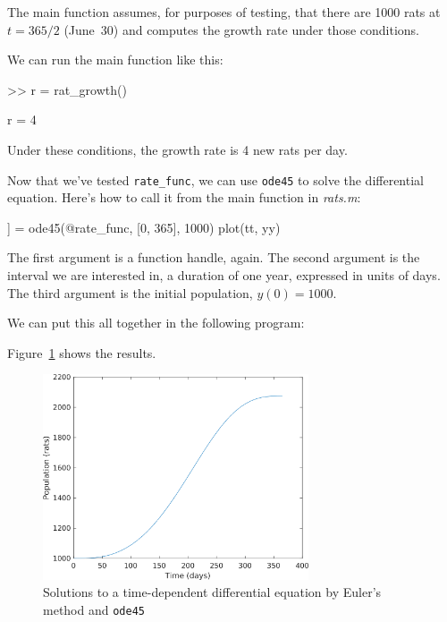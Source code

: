 The main function assumes, for purposes of testing, that
there are 1000 rats at $t=365/2$ (June~30) and computes the growth rate under those conditions.

We can run the main function like this:

\begin{code}
>> r = rat_growth()

r = 4
\end{code}

Under these conditions, the growth rate is 4 new rats per day.

Now that we've tested \lstinline{rate_func}, we can use \lstinline{ode45} to solve the differential equation.
Here's how to call it from the main function in \emph{rats.m}:

\begin{code}
[tt, yy]] = ode45(@rate_func, [0, 365], 1000)
plot(tt, yy)
\end{code}

The first argument is a function handle, again.  The second argument is the interval we are interested in, a duration of one year, expressed in units of days.
The third argument is the initial population, $y(0) = 1000$.


We can put this all together in the following program:


Figure~\ref{fig:rats} shows the results.

\begin{figure}[ht]
\centerline{\includegraphics[width=0.7\textwidth]{../code/chap09/rats.png}}
\caption{Solutions to a time-dependent differential equation by Euler's method and \lstinline{ode45}}
\label{fig:rats}
\end{figure}

